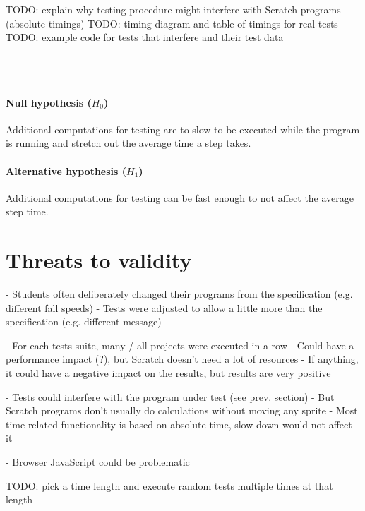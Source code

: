 TODO: explain why testing procedure might interfere with Scratch programs (absolute timings)
TODO: timing diagram and table of timings for real tests
TODO: example code for tests that interfere and their test data

~\\~\\
\paragraph{Null hypothesis ($H_0$)}
Additional computations for testing are to slow to be executed while the program is running and stretch out the average time a step takes.
\paragraph{Alternative hypothesis ($H_1$)}
Additional computations for testing can be fast enough to not affect the average step time.



\section{Threats to validity}
- Students often deliberately changed their programs from the specification (e.g. different fall speeds)
    - Tests were adjusted to allow a little more than the specification (e.g. different message)

- For each tests suite, many / all projects were executed in a row
    - Could have a performance impact (?), but Scratch doesn't need a lot of resources
    - If anything, it could have a negative impact on the results, but results are very positive

- Tests could interfere with the program under test (see prev. section)
    - But Scratch programs don't usually do calculations without moving any sprite
    - Most time related functionality is based on absolute time, slow-down would not affect it

- Browser JavaScript could be problematic


TODO: pick a time length and execute random tests multiple times at that length

